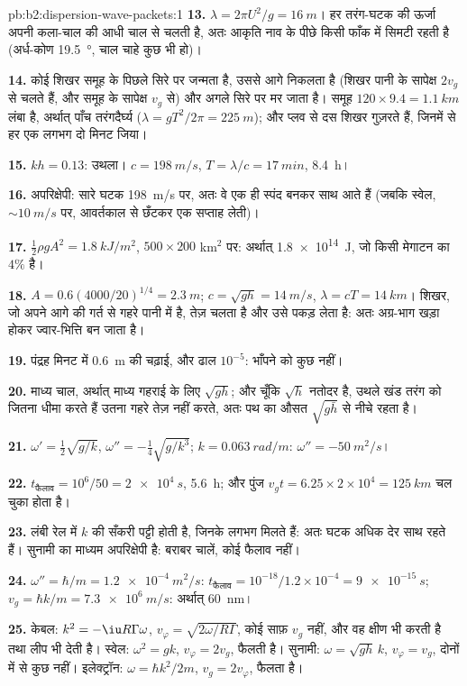 \begin{solution}{pb:b2:dispersion-wave-packets:1}
\textbf{13.} $\lambda = 2\pi U^2/g = \qty{16}{m}$। हर तरंग-घटक की ऊर्जा
अपनी कला-चाल की आधी चाल से चलती है, अतः आकृति नाव के पीछे किसी फाँक में
सिमटी रहती है (अर्ध-कोण \qty{19.5}{\degree}, चाल चाहे कुछ भी हो)।

\textbf{14.} कोई शिखर समूह के पिछले सिरे पर जन्मता है, उससे आगे निकलता है
(शिखर पानी के सापेक्ष $2v_g$ से चलते हैं, और समूह के सापेक्ष $v_g$ से)
और अगले सिरे पर मर जाता है। समूह $120 \times 9.4 = \qty{1.1}{km}$
लंबा है, अर्थात् पाँच तरंगदैर्घ्य ($\lambda = gT^2/2\pi = \qty{225}{m}$); और प्लव से दस शिखर
गुज़रते हैं, जिनमें से हर एक लगभग दो मिनट जिया।

\textbf{15.} $kh = 0.13$: उथला। $c = \qty{198}{m/s}$, $T = \lambda/c = \qty{17}{min}$,
\qty{8.4}{h}।

\textbf{16.} अपरिक्षेपी: सारे घटक \qty{198}{m/s} पर, अतः वे एक ही स्पंद बनकर
साथ आते हैं (जबकि स्वेल, $\sim\qty{10}{m/s}$ पर, आवर्तकाल से छँटकर
एक सप्ताह लेती)।

\textbf{17.} $\tfrac12\rho gA^2 = \qty{1.8}{kJ/m^2}$, $500 \times 200$ km$^2$ पर: अर्थात् \qty{1.8e14}{J},
जो किसी मेगाटन का $4\%$ है।

\textbf{18.} $A = 0.6(4000/20)^{1/4} = \qty{2.3}{m}$; $c = \sqrt{gh} = \qty{14}{m/s}$, $\lambda =
cT = \qty{14}{km}$। शिखर, जो अपने आगे की गर्त से गहरे पानी में है,
तेज़ चलता है और उसे पकड़ लेता है: अतः अग्र-भाग खड़ा होकर ज्वार-भित्ति बन जाता है।

\textbf{19.} पंद्रह मिनट में \qty{0.6}{m} की चढ़ाई, और ढाल
$10^{-5}$: भाँपने को कुछ नहीं।

\textbf{20.} माध्य चाल, अर्थात् माध्य गहराई के लिए $\sqrt{gh}$; और चूँकि
$\sqrt h$ नतोदर है, उथले खंड तरंग को जितना धीमा करते हैं उतना गहरे
तेज़ नहीं करते, अतः पथ का औसत $\sqrt{g\bar h}$ से नीचे रहता है।

\textbf{21.} $\omega' = \tfrac12\sqrt{g/k}$, $\omega'' = -\tfrac14\sqrt{g/k^3}$; $k = \qty{0.063}{rad/m}$:
$\omega'' = \qty{-50}{m^2/s}$।

\textbf{22.} $t_{\text{फैलाव}} = 10^6/50 = \qty{2e4}{s}$, \qty{5.6}{h}; और पुंज
$v_gt = 6.25 \times 2 \times 10^4 = \qty{125}{km}$ चल चुका होता है।

\textbf{23.} लंबी रेल में $k$ की सँकरी पट्टी होती है, जिनके  लगभग मिलते हैं: अतः घटक अधिक देर साथ रहते हैं।
सुनामी का माध्यम अपरिक्षेपी है: बराबर चालें, कोई फैलाव नहीं।

\textbf{24.} $\omega'' = \hbar/m = \qty{1.2e-4}{m^2/s}$: $t_{\text{फैलाव}} = 10^{-18}/1.2 \times
10^{-4} = \qty{9e-15}{s}$; $v_g = \hbar k/m = \qty{7.3e6}{m/s}$: अर्थात् \qty{60}{nm}।

\textbf{25.} केबल: $k^2 = -\iu R\Gamma\omega$, $v_\varphi = \sqrt{2\omega/R\Gamma}$, कोई साफ़
$v_g$ नहीं, और वह क्षीण भी करती है तथा लीप भी देती है। स्वेल: $\omega^2 = gk$, $v_\varphi = 2v_g$,
फैलती है। सुनामी: $\omega = \sqrt{gh}\,k$, $v_\varphi = v_g$, दोनों में से कुछ नहीं। इलेक्ट्रॉन:
$\omega = \hbar k^2/2m$, $v_g = 2v_\varphi$, फैलता है।
\end{solution}
